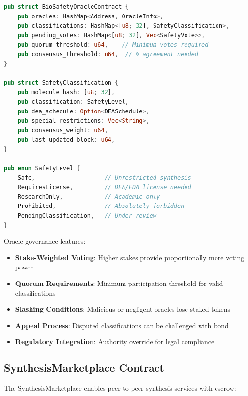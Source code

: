 \documentclass[12pt,a4paper]{article}
\begin{document}
\begin{lstlisting}[language=Rust,caption={BioSafety Oracle interface}]
pub struct BioSafetyOracleContract {
    pub oracles: HashMap<Address, OracleInfo>,
    pub classifications: HashMap<[u8; 32], SafetyClassification>,
    pub pending_votes: HashMap<[u8; 32], Vec<SafetyVote>>,
    pub quorum_threshold: u64,    // Minimum votes required
    pub consensus_threshold: u64,  // % agreement needed
}

pub struct SafetyClassification {
    pub molecule_hash: [u8; 32],
    pub classification: SafetyLevel,
    pub dea_schedule: Option<DEASchedule>,
    pub special_restrictions: Vec<String>,
    pub consensus_weight: u64,
    pub last_updated_block: u64,
}

pub enum SafetyLevel {
    Safe,                    // Unrestricted synthesis
    RequiresLicense,         // DEA/FDA license needed
    ResearchOnly,            // Academic only
    Prohibited,              // Absolutely forbidden
    PendingClassification,   // Under review
}
\end{lstlisting}

Oracle governance features:

\begin{itemize}
    \item \textbf{Stake-Weighted Voting}: Higher stakes provide proportionally more voting power
    \item \textbf{Quorum Requirements}: Minimum participation threshold for valid classifications
    \item \textbf{Slashing Conditions}: Malicious or negligent oracles lose staked tokens
    \item \textbf{Appeal Process}: Disputed classifications can be challenged with bond
    \item \textbf{Regulatory Integration}: Authority override for legal compliance
\end{itemize}

\subsection{SynthesisMarketplace Contract}

The SynthesisMarketplace enables peer-to-peer synthesis services with escrow:
\end{document}

